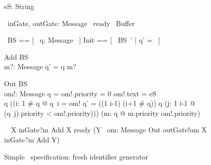 \documentclass{llncs}
\begin{document}
\begin{figure}[t]
  \setlength{\abovedisplayskip}{0pt}
  \begin{zed}
    [String]
  \end{zed}
  \begin{axdef}
    eS: String
  \end{axdef}
  \begin{circus}
    \circchannel\ inGate, outGate: Message
    \also%
    \circchannel\ ready
    \also%
    \circprocess\ Buffer \circdef \circbegin
   \end{circus}%
   {\setlength{\zedindent}{2\zedindent}%
     \begin{circusaction}
        \circstate\ BS == [~ q: \seq Message ~]
        \also %
        Init == [~ BS~' | q' = \langle \rangle ~]
      \end{circusaction}
      \begin{schema}{Add}
        \Delta BS
        \\ %
        m?: Message
      \where
        q' = q \cat \langle m? \rangle
      \end{schema}
      \begin{schema}{Out}
        \Delta BS
        \\%
        om!: Message
      \where
        q = \langle \rangle \implies om!.priority = 0 \land om!.text = eS
        \\ %
        q \neq \langle \rangle \implies ((\exists i: 1 \upto \# q @ q\ i = om! \land q' = ((1 \upto i-1) \cup (i+1 \upto \# q)) \extract q \land (\forall j: 1 \upto i-1 @ (q~j).priority < om!.priority))) \land (\forall m: \ran q @ m.priority \leq om!.priority)
      \end{schema}%
	\begin{circusaction}
	  \circspot\ \circmu\ X \circspot inGate?m \then \lschexpract Add \rschexpract \circseq X \extchoice ready \then
            (\circmu Y \circspot \circvar\ om: Message \circspot \lschexpract Out \rschexpract \circseq outGate!om \then X \extchoice inGate?m \then
                \lschexpract Add \rschexpract \circseq Y)
	\end{circusaction}
    }%
    \begin{circus} %
      \circend
    \end{circus}
  \caption{\label{figure:identifier-generator}Simple \Circus\ specification: fresh identifier generator}
\end{figure}
\end{document}
